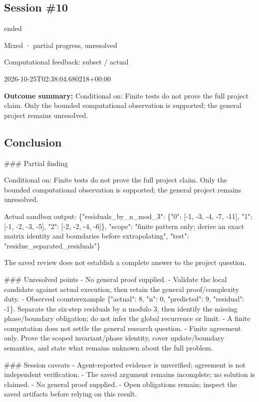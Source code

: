 \documentclass[11pt]{article}
\begin{document}
\subsection{Session \#10}
\begin{description}[style=nextline,font=\normalfont\bfseries,leftmargin=0pt,labelsep=0pt]
\item[Execution status] ended
\item[Outcome] Mixed · partial progress, unresolved
\item[Strategy] Computational feedback: subset / actual
\item[Started] 2026-10-25T02:38:04.680218+00:00
\end{description}
\textbf{Outcome summary:} Conditional on: Finite tests do not prove the full project claim. Only the bounded computational observation is supported; the general project remains unresolved.\par
\subsection{Conclusion}
\#\#\# Partial finding

Conditional on: Finite tests do not prove the full project claim. Only the bounded computational observation is supported; the general project remains unresolved.

Actual sandbox output: \{"residuals\_by\_n\_mod\_3": \{"0": [-1, -3, -4, -7, -11], "1": [-1, -2, -3, -5], "2": [-2, -2, -4, -6]\}, "scope": "finite pattern only; derive an exact matrix identity and boundaries before extrapolating", "test": "residue\_separated\_residuals"\}

The saved review does not establish a complete answer to the project question.

\#\#\# Unresolved points
- No general proof supplied.
- Validate the local candidate against actual execution, then retain the general proof/complexity duty.
- Observed counterexample \{"actual": 8, "n": 0, "predicted": 9, "residual": -1\}. Separate the six-step residuals by n modulo 3, then identify the missing phase/boundary obligation; do not infer the global recurrence or limit.
- A finite computation does not settle the general research question.
- Finite agreement only. Prove the scoped invariant/phase identity, cover update/boundary semantics, and state what remains unknown about the full problem.

\#\#\# Session caveats
- Agent-reported evidence is unverified; agreement is not independent verification.
- The saved argument remains incomplete; no solution is claimed.
- No general proof supplied.
- Open obligations remain; inspect the saved artifacts before relying on this result.
\end{document}

